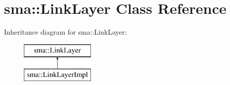 \hypertarget{classsma_1_1LinkLayer}{\section{sma\-:\-:Link\-Layer Class Reference}
\label{classsma_1_1LinkLayer}
}
Inheritance diagram for sma\-:\-:Link\-Layer\-:\begin{figure}[H]
\begin{center}
\leavevmode
\includegraphics[height=2.000000cm]{classsma_1_1LinkLayer}
\end{center}
\end{figure}
